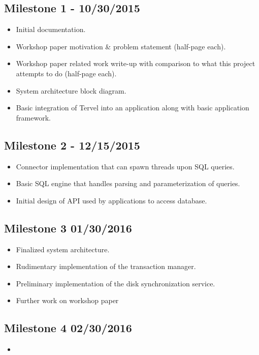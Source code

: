 \documentclass[letterpaper]{article}
\begin{document}
  \subsection{Milestone 1 - 10/30/2015}
  \begin{itemize}
   \item Initial documentation.
   \item Workshop paper motivation \& problem statement (half-page each).
   \item Workshop paper related work write-up with comparison to what this project attempts to do (half-page each).
   \item System architecture block diagram.
   \item Basic integration of Tervel into an application along with basic application framework.
  \end{itemize}
  \subsection{Milestone 2 - 12/15/2015}
  \begin{itemize}
   \item Connector implementation that can spawn threads upon SQL queries.
   \item Basic SQL engine that handles parsing and parameterization of queries.
   \item Initial design of API used by applications to access database.
  \end{itemize}
  \subsection{Milestone 3 01/30/2016}
  \begin{itemize}
   \item Finalized system architecture.
   \item Rudimentary implementation of the transaction manager.
   \item Preliminary implementation of the disk synchronization service.
   \item Further work on workshop paper
  \end{itemize}
  \subsection{Milestone 4 02/30/2016}
  \begin{itemize}
   \item 
  \end{itemize}
\end{document}
